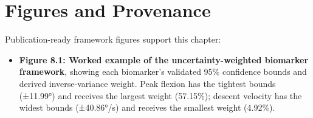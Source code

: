 \section{Figures and Provenance}
\label{sec:8-8-figures-and-provenance}


Publication-ready framework figures support this chapter:
\begin{itemize}
  \item \textbf{Figure 8.1: Worked example of the uncertainty-weighted biomarker framework}, showing each biomarker's validated 95\% confidence bounds and derived inverse-variance weight. Peak flexion has the tightest bounds (±11.99°) and receives the largest weight (57.15\%); descent velocity has the widest bounds (±40.86°/s) and receives the smallest weight (4.92\%).
\end{itemize}